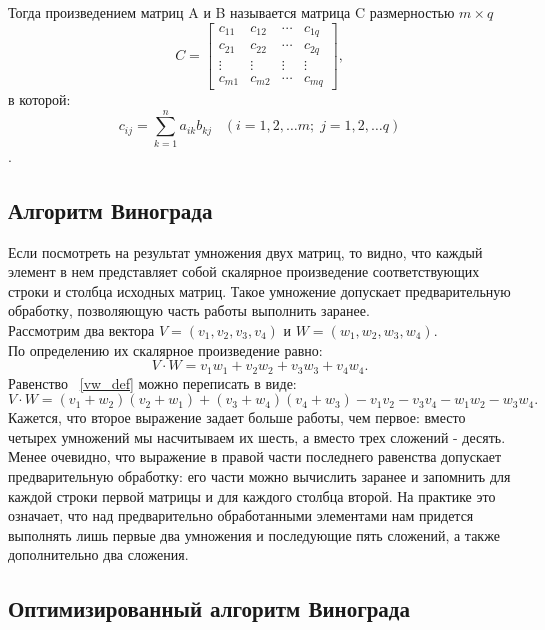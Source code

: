 \documentclass[12pt, a4paper]{report}
\begin{document}
	Тогда произведением матриц A и B называется матрица C размерностью  $m \times q$ 
	$$C = \begin{bmatrix} 
	c_{11} & c_{12} & \cdots & c_{1q} \\
	c_{21} & c_{22} & \cdots & c_{2q} \\ 
	\vdots & \vdots & \vdots & \vdots \\ 
	c_{m1} & c_{m2} & \cdots & c_{mq}	
	\end{bmatrix},$$
	в которой:
	$$c_{ij} = \sum_{k=1}^n a_{ik}b_{kj} \;\;\; \left(i=1, 2, \ldots m;\; j=1, 2, \ldots q \right)$$.\\

	\subsection{Алгоритм Винограда}
	Если посмотреть на результат умножения двух матриц, то видно, что каждый элемент в нем представляет собой скалярное произведение соответствующих строки и столбца исходных матриц. Такое умножение допускает предварительную обработку, позволяющую часть работы выполнить заранее.\\
	Рассмотрим два вектора $V = (v_{1}, v_{2}, v_{3}, v_{4})$ и $W = (w_{1}, w_{2}, w_{3}, w_{4})$.\\
	По определению их скалярное произведение равно:\\
	\begin{equation}
	\label{vw_def}
	V \cdot W = v_{1}w_{1} + v_{2}w_{2} + v_{3}w_{3} + v_{4}w_{4}.
	\end{equation}
	Равенство ~\ref{vw_def} можно переписать в виде:\\
	\begin{equation}
	\label{vw}
	V \cdot W = (v_{1} + w_{2})(v_{2} + w_{1}) + (v_{3} + w_{4})(v_{4} + w_{3}) - v_{1}v_{2} - v_{3}v_{4} - w_{1}w_{2} - w_{3}w_{4}.
	\end{equation}
	Кажется, что второе выражение задает больше работы, чем первое: вместо четырех умножений мы насчитываем их шесть, а вместо трех сложений - десять. Менее очевидно, что выражение в правой части последнего равенства допускает предварительную обработку: его части можно вычислить заранее и запомнить для каждой строки первой матрицы и для каждого столбца второй. На практике это означает, что над предварительно обработанными элементами нам придется выполнять лишь первые два умножения и последующие пять сложений, а также дополнительно два сложения.
	
	\subsection{Оптимизированный алгоритм Винограда}
	
\end{document}
